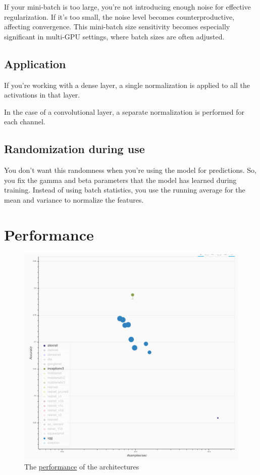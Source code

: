 \documentclass[11pt]{article}
\begin{document}
If your mini-batch is too large, you're not introducing enough noise for effective regularization. If it's too small, the noise level becomes counterproductive, affecting convergence. This mini-batch size sensitivity becomes especially significant in multi-GPU settings, where batch sizes are often adjusted.

\subsection{Application}

If you're working with a dense layer, a single normalization is applied to all the activations in that layer.

In the case of a convolutional layer, a separate normalization is performed for each channel.

\subsection{Randomization during use}

You don't want this randomness when you're using the model for predictions. So, you fix the gamma and beta parameters that the model has learned during training. Instead of using batch statistics, you use the running average for the mean and variance to normalize the features.

\section{Performance}

\begin{figure}[H]
    \centering
    \includegraphics[trim={0 0 0 0},clip,width=.7\linewidth]{figures/bokeh_plot.png}
    \caption{The \href{https://cv.gluon.ai/model_zoo/classification.html}{performance} of the architectures} \label{fig:architecture-comparison}
\end{figure}

\printbibliography
\end{document}
